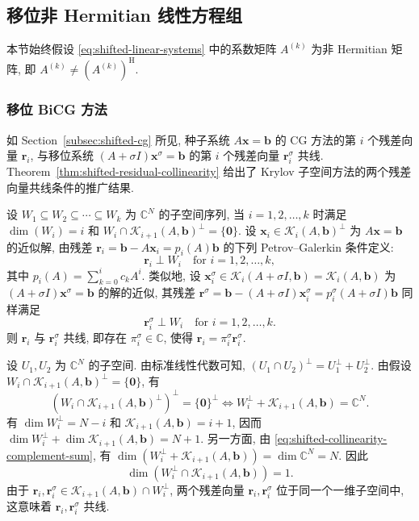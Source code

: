 \subsection{{移位非 Hermitian 线性方程组}}\label{sec:shifted-nonhermitian-systems}
{本节始终假设 \eqref{eq:shifted-linear-systems} 中的系数矩阵 $A^{(k)}$ 为非 Hermitian 矩阵, 即 $A^{(k)}\ne(A^{(k)})^{\mathrm H}$.}
\subsubsection{{移位 BiCG 方法}}\label{subsec:shifted-bicg}
{如 Section\ \ref{subsec:shifted-cg} 所见, 种子系统 $A\bm x=\bm b$ 的 CG 方法的第 $i$ 个残差向量 $\bm r_i$, 与移位系统 $(A+\sigma I)\bm x^{\sigma}=\bm b$ 的第 $i$ 个残差向量 $\bm r_i^{\sigma}$ 共线. Theorem\ \ref{thm:shifted-residual-collinearity} 给出了 Krylov 子空间方法的两个残差向量共线条件的推广结果.}
\par{}
\begin{Theorem}[\BookCite{67}]\label{thm:shifted-residual-collinearity}
{设 $W_1\subseteq W_2\subseteq\cdots\subseteq W_k$ 为 $\mathbb C^N$ 的子空间序列, 当 $i=1,2,\ldots,k$ 时满足 $\dim(W_i)=i$ 和 $W_i\cap\mathcal K_{i+1}(A,\bm b)^{\perp}=\{\bm0\}$. 设 $\bm x_i\in\mathcal K_i(A,\bm b)^{\perp}$ 为 $A\bm x=\bm b$ 的近似解, 由残差 $\bm r_i=\bm b-A\bm x_i=p_i(A)\bm b$ 的下列 Petrov--Galerkin 条件定义:}
\[\bm r_i\perp W_i\quad\text{for }i=1,2,\ldots,k,\]
{其中 $p_i(A)=\sum_{k=0}^i c_kA^i$. 类似地, 设 $\bm x_i^{\sigma}\in\mathcal K_i(A+\sigma I,\bm b)=\mathcal K_i(A,\bm b)$ 为 $(A+\sigma I)\bm x^{\sigma}=\bm b$ 的解的近似, 其残差 $\bm r^{\sigma}=\bm b-(A+\sigma I)\bm x_i^{\sigma}=p_i^{\sigma}(A+\sigma I)\bm b$ 同样满足}
\[\bm r_i^{\sigma}\perp W_i\quad\text{for }i=1,2,\ldots,k.\]
{则 $\bm r_i$ 与 $\bm r_i^{\sigma}$ 共线, 即存在 $\pi_i^{\sigma}\in\mathbb C$, 使得 $\bm r_i=\pi_i^{\sigma}\bm r_i^{\sigma}$.}
\end{Theorem}
\begin{Proof}
{设 $U_1,U_2$ 为 $\mathbb C^N$ 的子空间. 由标准线性代数可知, $(U_1\cap U_2)^{\perp}=U_1^{\perp}+U_2^{\perp}$. 由假设 $W_i\cap\mathcal K_{i+1}(A,\bm b)^{\perp}=\{\bm0\}$, 有}
\begin{equation}\label{eq:shifted-collinearity-complement-sum}(W_i\cap\mathcal K_{i+1}(A,\bm b)^{\perp})^{\perp}=\{\bm0\}^{\perp}\Leftrightarrow W_i^{\perp}+\mathcal K_{i+1}(A,\bm b)=\mathbb C^N.\end{equation}
{有 $\dim W_i^{\perp}=N-i$ 和 $\mathcal K_{i+1}(A,\bm b)=i+1$, 因而 $\dim W_i^{\perp}+\dim\mathcal K_{i+1}(A,\bm b)=N+1$. 另一方面, 由 \eqref{eq:shifted-collinearity-complement-sum}, 有 $\dim(W_i^{\perp}+\mathcal K_{i+1}(A,\bm b))=\dim\mathbb C^N=N$. 因此}
\[\dim(W_i^{\perp}\cap\mathcal K_{i+1}(A,\bm b))=1.\]
{由于 $\bm r_i,\bm r_i^{\sigma}\in\mathcal K_{i+1}(A,\bm b)\cap W_i^{\perp}$, 两个残差向量 $\bm r_i,\bm r_i^{\sigma}$ 位于同一个一维子空间中, 这意味着 $\bm r_i,\bm r_i^{\sigma}$ 共线.}\par\nopagebreak[4]\end{Proof}

